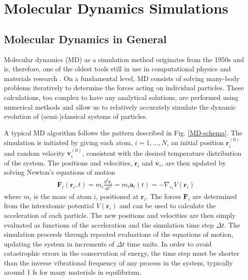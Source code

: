 \chapter{Molecular Dynamics Simulations}

\section{Molecular Dynamics in General}
Molecular dynamics (MD) as a simulation method originates from the 1950s and is, therefore, one of the oldest tools still in use in computational physics and materials research \cite{alder1957phase}.
On a fundamental level, MD consists of solving many-body problems iteratively to determine the forces acting on individual particles. 
These calculations, too complex to have any analytical solutions, are performed using numerical methods and allow us to relatively accurately simulate the dynamic evolution of (semi-)classical systems of particles. 

A typical MD algorithm follows the pattern described in Fig. \ref{MD-schema}. 
The simulation is initiated by giving each atom, $i=1,...,N$, an initial position $\mathbf{r}_i^{(0)}$ and random velocity $\mathbf{v}_i^{(0)}$, consistent with the desired temperature distribution of the system. 
The positions and velocities, $\mathbf{r}_i$ and $\mathbf{v}_i$, are then updated by solving Newton's equations of motion
\begin{align}
\mathbf{F}_i(\mathbf{r}_i,t) = m_i\frac{d^2\mathbf{r}_i}{dt^2} = m_i\mathbf{a}_i(t) = -\nabla_{r_i}V(\mathbf{r}_i)
\end{align}
where $m_i$ is the mass of atom i, positioned at $\mathbf{r}_i$. 
The forces $\mathbf{F}_i$ are determined from the interatomic potential $V(\mathbf{r}_i)$ and can be used to calculate the acceleration of each particle. 
The new positions and velocities are then simply evaluated as functions of the acceleration and the simulation time step $\Delta t$. 
The simulation proceeds through repeated evaluations of the equations of motion, updating the system in increments of $\Delta t$ time units. 
In order to avoid catastrophic errors in the conservation of energy, the time step must be shorter than the inverse vibrational frequency of any process in the system, typically around 1 fs for many materials in equilibrium. \cite{choe2000determination}

